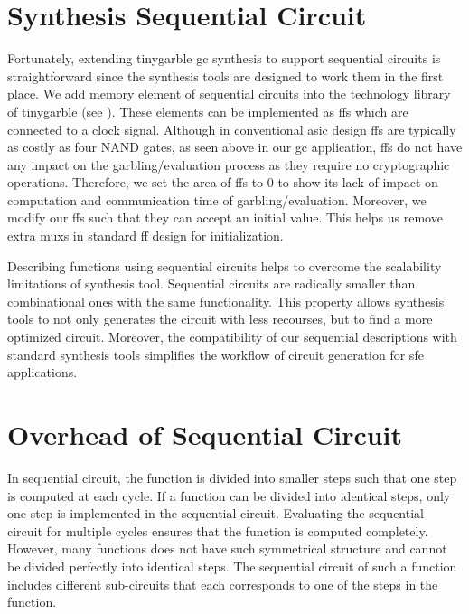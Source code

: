 \section{Synthesis Sequential Circuit}\label{sec:seq-syn}
Fortunately, extending \gls{tinygarble} \acrshort{gc} synthesis to support sequential circuits is straightforward since the synthesis tools are designed to work them in the first place.
We add memory element of sequential circuits into the technology library of \gls{tinygarble} (see ).
These elements can be implemented as \acrshort{ff}s which are connected to a clock signal.
Although in conventional \acrshort{asic} design \acrshort{ff}s are typically as costly as four NAND gates, as seen above in our \acrshort{gc} application, \acrshort{ff}s do not have any impact on the garbling/evaluation process as they require no cryptographic operations.
Therefore, we set the area of \acrshort{ff}s to 0 to show its lack of impact on computation and communication time of garbling/evaluation.
Moreover, we modify our \acrshort{ff}s such that they can accept an initial value.
This helps us remove extra \acrshort{mux}s in standard \acrshort{ff} design for initialization.

Describing functions using sequential circuits helps to overcome the scalability limitations of synthesis tool.
Sequential circuits are radically smaller than combinational ones with the same functionality.
This property allows synthesis tools to not only generates the circuit with less recourses, but to find a more optimized circuit.
Moreover, the compatibility of our sequential descriptions with standard synthesis tools simplifies the workflow of circuit generation for \acrshort{sfe} applications.

\section{Overhead of Sequential Circuit}\label{sec:seq-overhead}
In sequential circuit, the function is divided into smaller steps such that one step is computed at each cycle.
If a function can be divided into identical steps, only one step is implemented in the sequential circuit.
Evaluating the sequential circuit for multiple cycles ensures that the function is computed completely.
However, many functions does not have such symmetrical structure and cannot be divided perfectly into identical steps.
The sequential circuit of such a function includes different sub-circuits that each corresponds to one of the steps in the function.

